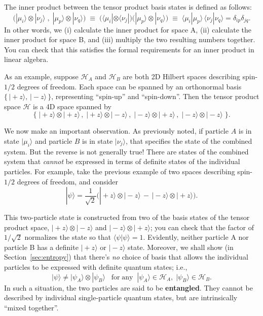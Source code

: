 \documentclass[pra,12pt]{revtex4}
\begin{document}
The inner product between the tensor product basis states is defined
as follows:
$$\Big(|\mu_i\rangle \otimes |\nu_j\rangle\;,\; |\mu_p\rangle \otimes |\nu_q\rangle \Big) \;\equiv\; \Big(\langle\mu_i| \otimes \langle\nu_j| \Big) \Big(|\mu_p\rangle \otimes |\nu_q\rangle\Big) \;\equiv\; \langle\mu_i|\mu_p\rangle \, \langle\nu_j|\nu_q\rangle = \delta_{ip}\delta_{jq}.$$
In other words, we (i) calculate the inner product for space A, (ii)
calculate the inner product for space B, and (iii) multiply the two
resulting numbers together.  You can check that this satisfies the
formal requirements for an inner product in linear algebra.

As an example, suppose $\mathscr{H}_A$ and $\mathscr{H}_B$ are both 2D
Hilbert spaces describing spin-$1/2$ degrees of freedom.  Each space
can be spanned by an orthonormal basis $\{\,|\!+\!z\rangle,
\,|\!-\!z\rangle \, \}$, representing ``spin-up'' and ``spin-down''.
Then the tensor product space $\mathscr{H}$ is a 4D space spanned by
$$\Big\{\;|\!+\!z\rangle\otimes|\!+\!z\rangle\,,\; |\!+\!z\rangle\otimes|\!-\!z\rangle\,,\; |\!-z\!\rangle\otimes|\!+\!z\rangle\,,\; |\!-\!z\rangle\otimes|\!-\!z\rangle \;\Big\}.$$

We now make an important observation.  As previously noted, if
particle $A$ is in state $|\mu_i\rangle$ and particle $B$ is in state
$|\nu_j\rangle$, that specifies the state of the combined system.  But
the reverse is not generally true!  There are states of the combined
system that \textit{cannot} be expressed in terms of definite states
of the individual particles.  For example, take the previous example
of two spaces describing spin-$1/2$ degrees of freedom, and consider
$$|\psi\rangle = \frac{1}{\sqrt{2}} \Big(|\!+\!z\rangle\otimes|\!-\!z\rangle \,-\, |\!-\!z\rangle\otimes|\!+\!z\rangle\Big).$$

This two-particle state is constructed from two of the basis states of
the tensor product space, $|\!+\!z\rangle\otimes|\!-\!z\rangle$ and
$|\!-\!z\rangle\otimes|\!+\!z\rangle$; you can check that the factor
of $1/\sqrt{2}$ normalizes the state so that $\langle\psi|\psi\rangle
= 1$.  Evidently, neither particle A nor particle B has a definite
$|\!+\!z\rangle$ or $|\!-\!z\rangle$ state.  Moreover, we shall show
(in Section~\ref{sec:entropy}) that there's \textit{no} choice of
basis that allows the individual particles to be expressed with
definite quantum states; i.e.,
$$|\psi\rangle \ne |\psi_A\rangle\otimes|\psi_B\rangle \;\;\;\textrm{for}\;\textrm{any}\;\; |\psi_A\rangle \in \mathscr{H}_A, \;|\psi_B\rangle \in \mathscr{H}_B.$$
In such a situation, the two particles are said to be
\textbf{entangled}.  They cannot be described by individual
single-particle quantum states, but are intrinsically ``mixed
together''.
\end{document}
